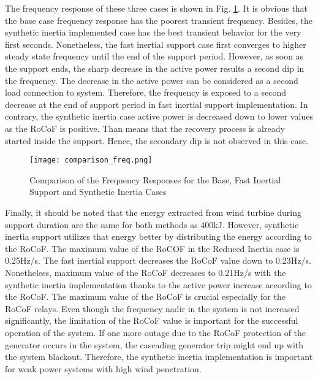 The frequency response of these three cases is shown in Fig. \ref{Comp_freq}. It is obvious that the base case frequency response has the poorest transient frequency. Besides, the synthetic inertia implemented case has the best transient behavior for the very first seconds. Nonetheless, the fast inertial support case first converges to higher steady state frequency until the end of the support period. However, as soon as the support ends, the sharp decrease in the active power results a second dip in the frequency. The decrease in the active power can be considered as a second load connection to system. Therefore, the frequency is exposed to a second decrease at the end of support period in fast inertial support implementation. In contrary, the synthetic inertia case active power is decreased down to lower values as the RoCoF is positive. Than means that the recovery process is already started inside the support. Hence, the secondary dip is not observed in this case. \par
\begin{figure}[h!]
	\centering
	\texttt{[image: comparison\_freq.png]}
	\caption{Comparison of the Frequency Responses for the Base, Fast Inertial Support and Synthetic Inertia Cases}
	\label{Comp_freq}
\end{figure}
Finally, it should be noted that the energy extracted from wind turbine during support duration are the same for both methods as 400kJ. However, synthetic inertia support utilizes that energy better by distributing the energy according to the RoCoF. The maximum value of the RoCOF in the Reduced Inertia case is 0.25Hz/s. The fast inertial support decreases the RoCoF value down to 0.23Hz/s. Nonetheless, maximum value of the RoCoF decreases to 0.21Hz/s with the synthetic inertia implementation thanks to the active power increase according to the RoCoF. The maximum value of the RoCoF is crucial especially for the RoCoF relays. Even though the frequency nadir in the system is not increased significantly, the limitation of the RoCoF value is important for the successful operation of the system. If one more outage due to the RoCoF protection of the generator occurs in the system, the cascading generator trip might end up with the system blackout. Therefore, the synthetic inertia implementation is important for weak power systems with high wind penetration.
